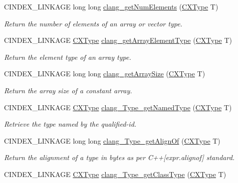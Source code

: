 \begin{DoxyCompactItemize}
C\+I\+N\+D\+E\+X\+\_\+\+L\+I\+N\+K\+A\+GE long long \mbox{\hyperlink{group__CINDEX__TYPES_gac5f636020c388126bec572cb1fb13007}{clang\+\_\+get\+Num\+Elements}} (\mbox{\hyperlink{structCXType}{C\+X\+Type}} T)
\begin{DoxyCompactList}\small\item\em Return the number of elements of an array or vector type. \end{DoxyCompactList}\item 
C\+I\+N\+D\+E\+X\+\_\+\+L\+I\+N\+K\+A\+GE \mbox{\hyperlink{structCXType}{C\+X\+Type}} \mbox{\hyperlink{group__CINDEX__TYPES_ga718591f4b07d9d4861557a3ed8b29713}{clang\+\_\+get\+Array\+Element\+Type}} (\mbox{\hyperlink{structCXType}{C\+X\+Type}} T)
\begin{DoxyCompactList}\small\item\em Return the element type of an array type. \end{DoxyCompactList}\item 
C\+I\+N\+D\+E\+X\+\_\+\+L\+I\+N\+K\+A\+GE long long \mbox{\hyperlink{group__CINDEX__TYPES_ga91521260817054f153b5f1295056192d}{clang\+\_\+get\+Array\+Size}} (\mbox{\hyperlink{structCXType}{C\+X\+Type}} T)
\begin{DoxyCompactList}\small\item\em Return the array size of a constant array. \end{DoxyCompactList}\item 
C\+I\+N\+D\+E\+X\+\_\+\+L\+I\+N\+K\+A\+GE \mbox{\hyperlink{structCXType}{C\+X\+Type}} \mbox{\hyperlink{group__CINDEX__TYPES_gac6d90c2acdae77f75d8e8288658da463}{clang\+\_\+\+Type\+\_\+get\+Named\+Type}} (\mbox{\hyperlink{structCXType}{C\+X\+Type}} T)
\begin{DoxyCompactList}\small\item\em Retrieve the type named by the qualified-\/id. \end{DoxyCompactList}\item 
C\+I\+N\+D\+E\+X\+\_\+\+L\+I\+N\+K\+A\+GE long long \mbox{\hyperlink{group__CINDEX__TYPES_gaee56de66c69ab5605fe47e7c52497e31}{clang\+\_\+\+Type\+\_\+get\+Align\+Of}} (\mbox{\hyperlink{structCXType}{C\+X\+Type}} T)
\begin{DoxyCompactList}\small\item\em Return the alignment of a type in bytes as per C++\mbox{[}expr.\+alignof\mbox{]} standard. \end{DoxyCompactList}\item 
C\+I\+N\+D\+E\+X\+\_\+\+L\+I\+N\+K\+A\+GE \mbox{\hyperlink{structCXType}{C\+X\+Type}} \mbox{\hyperlink{group__CINDEX__TYPES_ga4434129ffc0fb0fc668a593e226d62cc}{clang\+\_\+\+Type\+\_\+get\+Class\+Type}} (\mbox{\hyperlink{structCXType}{C\+X\+Type}} T)

\end{DoxyCompactItemize}
